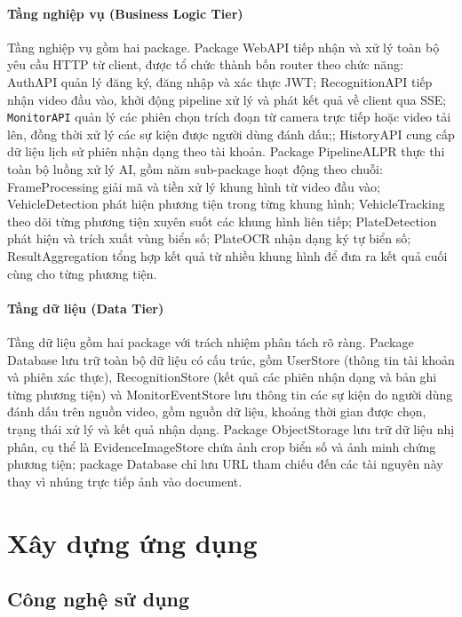 \documentclass[../DoAn.tex]{subfiles}
\begin{document}
\paragraph{Tầng nghiệp vụ (Business Logic Tier)}
Tầng nghiệp vụ gồm hai package. Package WebAPI tiếp nhận và xử lý toàn bộ yêu cầu HTTP từ client, được tổ chức thành bốn router theo chức năng: AuthAPI quản lý đăng ký, đăng nhập và xác thực JWT; RecognitionAPI tiếp nhận video đầu vào, khởi động pipeline xử lý và phát kết quả về client qua SSE; \texttt\texttt{MonitorAPI} quản lý các phiên chọn trích đoạn từ camera trực tiếp hoặc video tải lên, đồng thời xử lý các sự kiện được người dùng đánh dấu;; HistoryAPI cung cấp dữ liệu lịch sử phiên nhận dạng theo tài khoản. Package PipelineALPR thực thi toàn bộ luồng xử lý AI, gồm năm sub-package hoạt động theo chuỗi: FrameProcessing giải mã và tiền xử lý khung hình từ video đầu vào; VehicleDetection phát hiện phương tiện trong từng khung hình; VehicleTracking theo dõi từng phương tiện xuyên suốt các khung hình liên tiếp; PlateDetection phát hiện và trích xuất vùng biển số; PlateOCR nhận dạng ký tự biển số; ResultAggregation tổng hợp kết quả từ nhiều khung hình để đưa ra kết quả cuối cùng cho từng phương tiện.

\paragraph{Tầng dữ liệu (Data Tier)}
Tầng dữ liệu gồm hai package với trách nhiệm phân tách rõ ràng. Package Database lưu trữ toàn bộ dữ liệu có cấu trúc, gồm UserStore (thông tin tài khoản và phiên xác thực), RecognitionStore (kết quả các phiên nhận dạng và bản ghi từng phương tiện) và MonitorEventStore lưu thông tin các sự kiện do người dùng đánh dấu trên nguồn video, gồm nguồn dữ liệu, khoảng thời gian được chọn, trạng thái xử lý và kết quả nhận dạng. Package ObjectStorage lưu trữ dữ liệu nhị phân, cụ thể là EvidenceImageStore chứa ảnh crop biển số và ảnh minh chứng phương tiện; package Database chỉ lưu URL tham chiếu đến các tài nguyên này thay vì nhúng trực tiếp ảnh vào document.

\section{Xây dựng ứng dụng}
\label{section:4.2}

\subsection{Công nghệ sử dụng}
\label{subsection:4.2.1}
\end{document}
